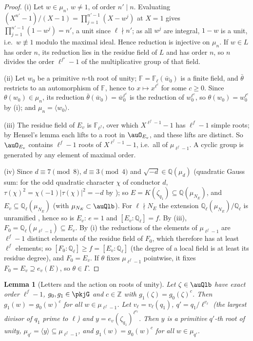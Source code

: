 \documentclass[10pt]{amsart}
\newtheorem{lemma}[theorem]{Lemma}
\theoremstyle{definition}
\theoremstyle{remark}
\newcommand{\Z}{\mathbb Z}
\newcommand{\Q}{\mathbb Q}
\begin{document}
\begin{proof}
(i) Let $w\in\mu_n$, $w\ne1$, of order $n'\mid n$. Evaluating $(X^{n'}-1)/(X-1)=\prod_{j=1}^{n'-1}(X-w^j)$
at $X=1$ gives $\prod_{j=1}^{n'-1}(1-w^j)=n'$, a unit since $\ell\nmid n'$; as all $w^j$ are integral,
$1-w$ is a unit, i.e.\ $w\not\equiv1$ modulo the maximal ideal. Hence reduction is injective on
$\mu_n$. If $w\in L$ has order $n$, its reduction lies in the residue field of $L$ and has order $n$,
so $n$ divides the order $\ell^{f'}-1$ of the multiplicative group of that field.

(ii) Let $w_0$ be a primitive $n$-th root of unity; $\mathbb F=\mathbb F_\ell(\bar w_0)$ is a finite
field, and $\bar\theta$ restricts to an automorphism of $\mathbb F$, hence to $x\mapsto x^{\ell^c}$ for some
$c\ge0$. Since $\theta(w_0)\in\mu_n$, its reduction $\bar\theta(\bar w_0)=\bar w_0^{\ell^c}$ is the reduction of
$w_0^{\ell^c}$, so $\theta(w_0)=w_0^{\ell^c}$ by (i); and $\mu_n=\langle w_0\rangle$.

(iii) The residue field of $E_v$ is $\mathbb F_{\ell^f}$, over which $X^{\ell^f-1}-1$ has $\ell^f-1$
simple roots; by Hensel's lemma \cite[II, \S4, Proposition~7, p.~34]{SerreLF} each lifts to a
root in $\auO_{E_v}$, and these lifts are distinct. So $\auO_{E_v}$ contains $\ell^f-1$ roots of
$X^{\ell^f-1}-1$, i.e.\ all of $\mu_{\ell^f-1}$. A cyclic group is generated by any element of maximal
order.

(iv) Since $d\equiv7\pmod8$, $d\equiv3\pmod4$ and $\sqrt{-d}\in\Q(\mu_d)$ (quadratic Gauss sum: for the odd quadratic character $\chi$ of conductor $d$,
$\tau(\chi)^2=\chi(-1)|\tau(\chi)|^2=-d$ by \cite[Lemmas~4.7 and~4.8]{Washington}); so $E=K(\zeta_{q_1})\subseteq\Q(\mu_{N_E})$, and
$E_v\subseteq\Q_\ell(\mu_{N_E})$ (with $\mu_{N_E}\subset\auQlb$). For $\ell\nmid N_E$ the extension
$\Q_\ell(\mu_{N_E})/\Q_\ell$ is unramified \cite[IV, \S4, Proposition~16, p.~77]{SerreLF}, hence so is
$E_v$: $e=1$ and $[E_v:\Q_\ell]=f$. By (iii), $F_0=\Q_\ell(\mu_{\ell^f-1})\subseteq E_v$. By (i) the
reductions of the elements of $\mu_{\ell^f-1}$ are $\ell^f-1$ distinct elements of the residue field of
$F_0$, which therefore has at least $\ell^f$ elements; so $[F_0:\Q_\ell]\ge f=[E_v:\Q_\ell]$ (the degree
of a local field is at least its residue degree), and $F_0=E_v$. If $\theta$ fixes $\mu_{\ell^f-1}$
pointwise, it fixes $F_0=E_v\supseteq e_v(E)$, so $\theta\in\Gamma$.
\end{proof}

\begin{lemma}[Letters and the action on roots of unity]\label{pkj:transfer}
Let $\zeta\in\auQlb$ have exact order $\ell^f-1$, $g_0,g_1\in\pkjG$ and $c\in\Z$ with
$g_1(\zeta)=g_0(\zeta)^c$. Then $g_1(w)=g_0(w)^c$ for all $w\in\mu_{\ell^f-1}$. Let $v_\ell=v_\ell(q_1)$,
$q'=q_1/\ell^{v_\ell}$ (the largest divisor of $q_1$ prime to $\ell$) and $y=e_v(\zeta_{q_1})^{\ell^{v_\ell}}$.
Then $y$ is a primitive $q'$-th root of unity, $\mu_{q'}=\langle y\rangle\subseteq\mu_{\ell^f-1}$, and
$g_1(w)=g_0(w)^c$ for all $w\in\mu_{q'}$.
\end{lemma}
\end{document}
